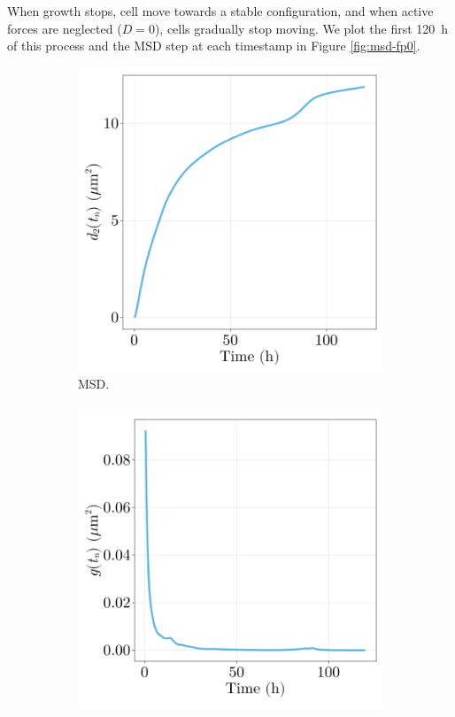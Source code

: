 When growth stops, cell move towards a stable configuration, and when active forces are neglected ($D=0$), cells gradually stop moving. We plot the first \SI{120}{\hour} of this process and the MSD step at each timestamp in Figure \ref{fig:msd-fp0}.
\begin{figure}[h]
    \centering
    \begin{subfigure}{0.4\textwidth}
        \centering
        \includegraphics[width=\textwidth]{figures/404/404-mse-fp0-120s.png}
        \caption{MSD.}
    \end{subfigure}
    \hspace{4em}
    \begin{subfigure}{0.4\textwidth}
        \centering
        \includegraphics[width=\textwidth]{figures/404/404-step-fp0-120s.png}

\end{subfigure}
\end{figure}
